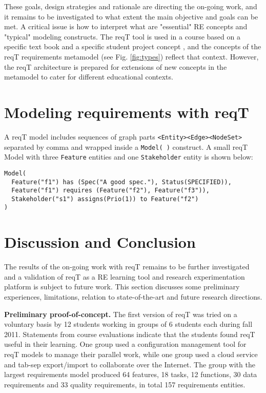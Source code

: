 \documentclass[a4paper]{llncs}
\begin{document}
These goals, design strategies and rationale are directing the on-going work, and it remains to be investigated to what extent the main objective and goals can be met. A critical issue is how to interpret what are "essential" RE concepts and "typical" modeling constructs. The reqT tool is used in a course based on a specific text book \cite{Lauesen2002} and a specific student project concept \cite{ets170}, and the concepts of the reqT requirements metamodel (see Fig. \ref{fig:types}) reflect that context. However, the reqT architecture is prepared for extensions of new concepts in the metamodel to cater for different educational contexts. 
\section{Modeling requirements with reqT}\label{section:metamodel}

A reqT model includes sequences of graph parts {\tt<Entity><Edge><NodeSet>}  separated by comma and wrapped inside a {\tt Model( )} construct. A small reqT Model with three {\tt Feature} entities and one {\tt Stakeholder} entity is shown below:
\begin{spacing}{0.8}
\begingroup
    \fontsize{8pt}{12pt}\selectfont
\begin{verbatim}
Model(
  Feature("f1") has (Spec("A good spec."), Status(SPECIFIED)),
  Feature("f1") requires (Feature("f2"), Feature("f3")),
  Stakeholder("s1") assigns(Prio(1)) to Feature("f2")
)
\end{verbatim}
\endgroup
\end{spacing}




\section{Discussion and Conclusion}\label{section:discussion}

 The results of the on-going work with reqT remains to be further investigated and a validation of reqT as a RE learning tool and research experimentation platform is subject to future work. This section discusses some preliminary experiences, limitations, relation to state-of-the-art and future research directions.

{\bf Preliminary proof-of-concept.}
The first version of reqT was tried on a voluntary basis by 12 students working in groups of 6 students each during fall 2011. Statements from course evaluations indicate that the students found reqT useful in their learning. One group used a configuration management tool for reqT models to manage  their parallel work, while one group used a cloud service and tab-sep export/import to collaborate over the Internet. The group with the largest requirements model produced 64 features, 18 tasks, 12 functions, 30 data requirements and 33 quality requirements, in total 157 requirements entities.
\end{document}
